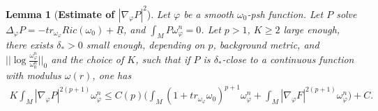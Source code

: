 \documentclass[11pt]{amsart}
\newtheorem{lem}{Lemma}[section]
\numberwithin{equation}{section}
\begin{document}
\begin{lem}[\textbf{Estimate of $|\nabla_\varphi P|^2$}]\label{Lem315}
	Let $\varphi$ be a smooth $\omega_0$-psh function.  Let $P$ solve $\Delta_{\varphi}P=-tr_{\omega_{\varphi}}Ric(\omega_0)+\underline{R}$,  and $\int_MP\omega_{\varphi}^n=0$.  Let $p>1$,  $K\ge 2$ large enough,  there exists $\delta_*>0$ small enough,  depending on $p$,  background metric,  and $||\log\frac{\omega_{\varphi}^n}{\omega_0^n}||_0$ and the choice of $K$,  such that if $P$ is $\delta_*$-close to a continuous function with modulus $\omega(r)$,  one has 
	\begin{align}
		K\int_M|\nabla_{\varphi}P|^{2(p+1)}\omega_{\varphi}^n\le C(p)\big(\int_M(1+tr_{\omega_{\varphi}}\omega_0)^{p+1}\omega_{\varphi}^n+\int_M|\nabla_{\varphi}F|^{2(p+1)}\omega_{\varphi}^n\big)+C. 
	\end{align}\\
\end{lem}
\end{document}
